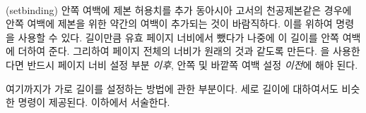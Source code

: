 \begin{syntax}
\cmd{\setbinding} \\
\end{syntax}
\glossary(setbinding)%
  {}%
  {안쪽 여백에 제본 허용치를 추가}
동아시아 고서의 천공제본같은 경우에 안쪽 여백에 제본을 위한 약간의 여백이 추가되는
것이 바람직하다. 이를 위하여 \cmd{\setbinding} 명령을 사용할 수 있다.
 길이만큼 유효 페이지 너비에서 뺐다가 나중에 이 길이를
안쪽 여백에 더하여 준다. 그리하여 페이지 전체의 너비가 원래의 것과 같도록 만든다.
\cmd{\setbinding}을 사용한다면 반드시 페이지 너비 설정 부분 \emph{이후},
안쪽 및 바깥쪽 여백 설정 \emph{이전}에 해야 된다.

여기까지가 가로 길이를 설정하는 방법에 관한 부분이다. 세로 길이에 대하여서도
비슷한 명령이 제공된다. 이하에서 서술한다.


